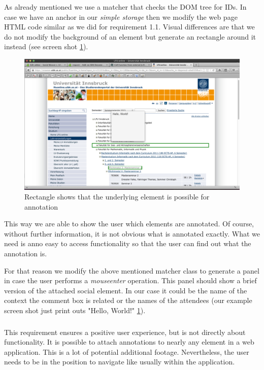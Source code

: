 As already mentioned we use a matcher that checks the DOM tree for IDs. In case we have an anchor in our \emph{simple storage} then we modify the web page HTML code similar as we did for requirement 1.1. Visual differences are that we do not modify the background of an element but generate an rectangle around it instead (see screen shot \ref{annotation-rectangle-sample2}). 

\begin{figure} \centering
		\includegraphics[width=12cm]{images/annotation-rectangle-sample2.png}
		\caption{Rectangle shows that the underlying element is possible for annotation}
		\label{annotation-rectangle-sample2}
\end{figure} 

This way we are able to show the user which elements are annotated. Of course, without further information, it is not obvious what is annotated exactly. What we need is anno easy to access functionality so that the user can find out what the annotation is. 

For that reason we modify the above mentioned matcher class to generate a panel in case the user performs a \emph{mouseenter} operation. This panel should show a brief version of the attached social element. In our case it could be the name of the context the comment box is related or the names of the attendees (our example screen shot just print outs "Hello, World!" \ref{annotation-rectangle-sample2}). 

\subsubsection[User View Management]{\reqPii}\label{user-disturbance}

This requirement ensures a positive user experience, but is not directly about functionality. It is possible to attach annotations to nearly any element in a web application. This is a lot of potential additional footage. Nevertheless, the user needs to be in the position to navigate like usually within the application. 

